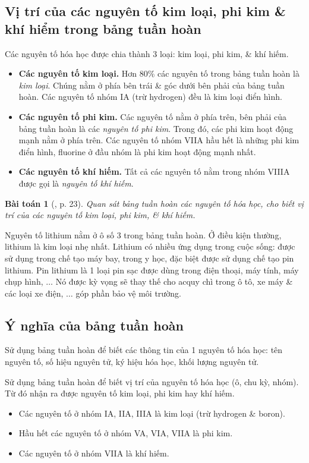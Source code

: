 \documentclass{article}
\newtheorem{baitoan}{Bài toán}
\begin{document}
\subsection{Vị trí của các nguyên tố kim loại, phi kim \& khí hiểm trong bảng tuần hoàn}
Các nguyên tố hóa học được chia thành 3 loại: kim loại, phi kim, \& khí hiếm.
\begin{itemize}
	\item \textbf{Các nguyên tố kim loại.} Hơn 80\% các nguyên tố trong bảng tuần hoàn là \textit{kim loại}. Chúng nằm ở phía bên trái \& góc dưới bên phải của bảng tuần hoàn. Các nguyên tố nhóm IA (trừ hydrogen) đều là kim loại điển hình.
	\item \textbf{Các nguyên tố phi kim.} Các nguyên tố nằm ở phía trên, bên phải của bảng tuần hoàn là các \textit{nguyên tố phi kim}. Trong đó, các phi kim hoạt động mạnh nằm ở phía trên. Các nguyên tố nhóm VIIA hầu hết là những phi kim điển hình, fluorine ở đầu nhóm là phi kim hoạt động mạnh nhất.
	\item \textbf{Các nguyên tố khí hiếm.} Tất cả các nguyên tố nằm trong nhóm VIIIA được gọi là \textit{nguyên tố khí hiếm}.
\end{itemize}

\begin{baitoan}[\cite{SGK_KHTN_7_Canh_Dieu}, p. 23]
	Quan sát bảng tuần hoàn các nguyên tố hóa học, cho biết vị trí của các nguyên tố kim loại, phi kim, \& khí hiếm.
\end{baitoan}
Nguyên tố lithium  nằm ở ô số 3 trong bảng tuần hoàn. Ở điều kiện thường, lithium là kim loại nhẹ nhất. Lithium có nhiều ứng dụng trong cuộc sống: được sử dụng trong chế tạo máy bay, trong y học, đặc biệt được sử dụng chế tạo pin lithium. Pin lithium là 1 loại pin sạc được dùng trong điện thoại, máy tính, máy chụp hình, $\ldots$ Nó được kỳ vọng sẽ thay thế cho acquy chì trong ô tô, xe máy \& các loại xe điện, $\ldots$ góp phần bảo vệ môi trường.

\subsection{Ý nghĩa của bảng tuần hoàn}
Sử dụng bảng tuần hoàn để biết các thông tin của 1 nguyên tố hóa học: tên nguyên tố, số hiệu nguyên tử, ký hiệu hóa học, khối lượng nguyên tử.

Sử dụng bảng tuần hoàn để biết vị trí của nguyên tố hóa học (ô, chu kỳ, nhóm). Từ đó nhận ra được nguyên tố kim loại, phi kim hay khí hiếm.
\begin{itemize}
	\item Các nguyên tố ở nhóm IA, IIA, IIIA là kim loại (trừ hydrogen \& boron).
	\item Hầu hết các nguyên tố ở nhóm VA, VIA, VIIA là phi kim.
	\item Các nguyên tố ở nhóm VIIA là khí hiếm.
\end{itemize}
\end{document}
